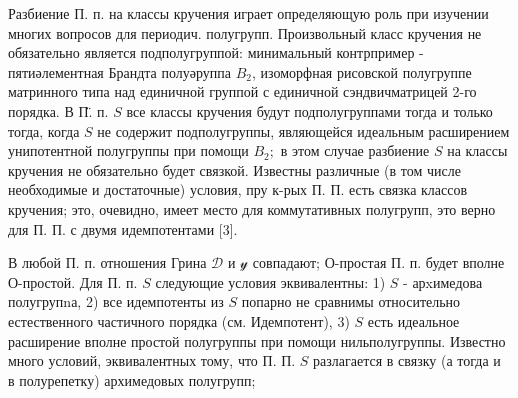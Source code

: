 \documentclass[10pt]{article}
\begin{document}
Разбиение П. п. на классы кручения играет определяющую роль при изучении многих вопросов для периодич. полугрупп. Произвольный класс кручения не обязательно является подполугруппой: минимальный контрпример - пятиәлементная Брандта полуәруппа $B_{2}$, изоморфная рисовской полугруппе матринного типа над единичной группой с единичной сэндвичматрицей 2-го порядка. В П̈. п. $S$ все классы кручения будут подполугруппами тогда и только тогда, когда $S$ не содержит подполугруппы, являющейся идеальным расширением унипотентной полугруппы при помощи $B_{2} ;$ в этом случае разбиение $S$ на классы кручения не обязательно будет связкой. Известны различные (в том числе необходимые и достаточные) условия, пру к-рых П. П. есть связка классов кручения; это, очевидно, имеет место для коммутативных полугрупп, это верно для П. П. с двумя идемпотентами [3].



В любой П. п. отношения Грина $\mathscr{D}$ и $\mathcal{y}$ совпадают; О-простая П. п. будет вполне О-простой. Для П. п. $S$ следующие условия эквивалентны: 1) $S$ - арxимедова полугрупnа, 2) все идемпотенты из $S$ попарно не сравнимы относительно естественного частичного порядка (см. Идемпотент), 3) $S$ есть идеальное расширение вполне простой полугруппы при помощи нильполугруппы. Известно много условий, эквивалентных тому, что П. П. $S$ разлагается в связку (а тогда и в полурепетку) архимедовых полугрупп;
\end{document}
